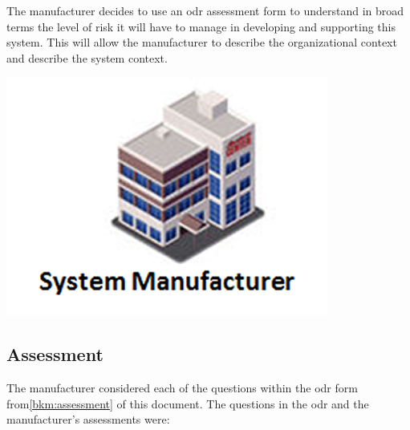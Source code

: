 %
%
\begin{minipage}[t][2cm]{0.73\textwidth}
  The manufacturer decides to use an \gls{odr} assessment form to understand in broad terms the level of risk it will have to manage in developing and supporting this system. This will allow the manufacturer to describe the organizational context and describe the system context.
\end{minipage}
\begin{minipage}[c][1cm]{0.25\textwidth}
	\vspace{1cm}
  \centering
    \includegraphics[width=\textwidth]{images/manufacturer}
\end{minipage}

\subsection{ Assessment}
The manufacturer considered each of the questions within the \gls{odr} form from\autoref{bkm:assessment} of this document.
The questions in the \gls{odr} and the manufacturer's assessments were:


